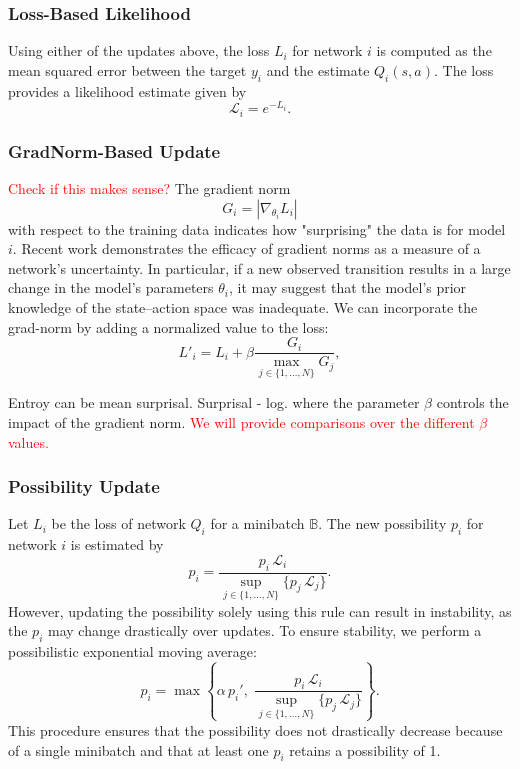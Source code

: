 \documentclass[12pt,a4paper]{report}
\newcommand\myworries[1]{\textcolor{red}{#1}}
\begin{document}
\subsubsection{Loss-Based Likelihood}
Using either of the updates above, the loss \(L_i\) for network \(i\) is computed as the mean squared error between the target \(y_i\) and the estimate \(Q_i(s,a)\). The loss provides a likelihood estimate given by
\[
  \mathcal{L}_i = e^{-L_i}.
\]

\subsubsection{GradNorm-Based Update}
\myworries{Check if this makes sense?}
The gradient norm
\[
  G_i = \left\lvert \nabla_{\theta_i} L_i \right\rvert
\]
with respect to the training data indicates how "surprising" the data is for model \(i\). Recent work \cite{Lee2020} demonstrates the efficacy of gradient norms as a measure of a network's uncertainty. In particular, if a new observed transition results in a large change in the model's parameters \(\theta_i\), it may suggest that the model's prior knowledge of the state–action space was inadequate. We can incorporate the grad-norm by adding a normalized value to the loss:
\[
  L'_i = L_i + \beta \frac{G_i}{\max_{j \in \{1, \dots, N\}} G_j},
\]

Entroy can be mean surprisal. Surprisal - log. 
where the parameter \(\beta\) controls the impact of the gradient norm. \myworries{We will provide comparisons over the different \(\beta\) values.}

\subsubsection{Possibility Update}
Let \(L_i\) be the loss of network \(Q_i\) for a minibatch \(\mathbb{B}\). The new possibility \(p_i\) for network \(i\) is estimated by
\[
  p_i = \frac{p_i \, \mathcal{L}_i}{\sup_{j \in \{1, \dots, N\}} \{p_j \, \mathcal{L}_j\}}.
\]
However, updating the possibility solely using this rule can result in instability, as the \(p_i\) may change drastically over updates. To ensure stability, we perform a possibilistic exponential moving average:
\[
  p_i = \max \left\{ \alpha\, p_i', \; \frac{p_i \, \mathcal{L}_i}{\sup_{j \in \{1, \dots, N\}} \{p_j \, \mathcal{L}_j\}} \right\}.
\]
This procedure ensures that the possibility does not drastically decrease because of a single minibatch and that at least one \(p_i\) retains a possibility of 1.
\end{document}

